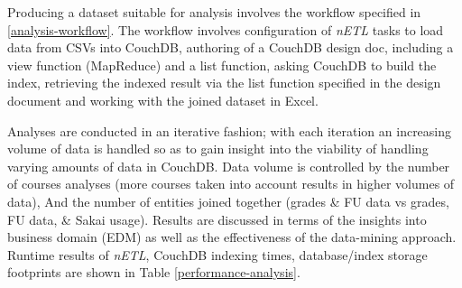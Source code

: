 Producing a dataset suitable for analysis involves the workflow specified in \ref{analysis-workflow}. The workflow involves configuration of \textit{nETL} tasks to load data from CSVs into CouchDB, authoring of a CouchDB design doc, including a view function (MapReduce) and a list function, asking CouchDB to build the index, retrieving the indexed result via the list function specified in the design document and working with the joined dataset in Excel.

Analyses are conducted in an iterative fashion; with each iteration an increasing volume of data is handled so as to gain insight into the viability of handling varying amounts of data in CouchDB. Data volume is controlled by the number of courses analyses (more courses taken into account results in higher volumes of data), And the number of entities joined together (grades \& FU data vs grades, FU data, \& Sakai usage). Results are discussed in terms of the insights into business domain (EDM) as well as the effectiveness of the data-mining approach. Runtime results of \textit{nETL}, CouchDB indexing times, database/index storage footprints are shown in Table \ref{performance-analysis}.

